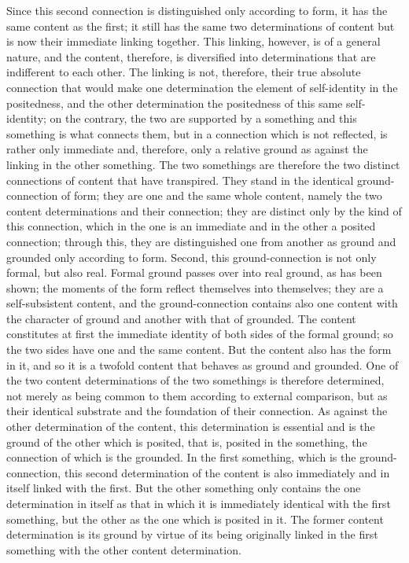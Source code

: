 Since this second connection is
distinguished only according to form,
it has the same content as the first;
it still has the same two determinations of content
but is now their immediate linking together.
This linking, however, is of a general nature,
and the content, therefore, is diversified into determinations
that are indifferent to each other.
The linking is not, therefore, their true absolute connection
that would make one determination the element of
self-identity in the positedness,
and the other determination
the positedness of this same self-identity;
on the contrary, the two are supported by a something
and this something is what connects them,
but in a connection which is not reflected,
is rather only immediate and, therefore,
only a relative ground as against
the linking in the other something.
The two somethings are therefore the two distinct
connections of content that have transpired.
They stand in the identical ground-connection of form;
they are one and the same whole content,
namely the two content determinations and their connection;
they are distinct only by the kind of this connection,
which in the one is an immediate
and in the other a posited connection;
through this, they are distinguished
one from another as ground and grounded only according to form.
Second, this ground-connection is not only formal, but also real.
Formal ground passes over into real ground, as has been shown;
the moments of the form reflect themselves into themselves;
they are a self-subsistent content,
and the ground-connection contains
also one content with the character of ground
and another with that of grounded.
The content constitutes at first the immediate
identity of both sides of the formal ground;
so the two sides have one and the same content.
But the content also has the form in it,
and so it is a twofold content
that behaves as ground and grounded.
One of the two content determinations of
the two somethings is therefore determined,
not merely as being common to them
according to external comparison,
but as their identical substrate
and the foundation of their connection.
As against the other determination of the content,
this determination is essential
and is the ground of the other which is posited,
that is, posited in the something,
the connection of which is the grounded.
In the first something, which is the ground-connection,
this second determination of the content is
also immediately and in itself linked with the first.
But the other something only contains
the one determination in itself as that
in which it is immediately identical with the first something,
but the other as the one which is posited in it.
The former content determination is its
ground by virtue of its being originally linked
in the first something with
the other content determination.

